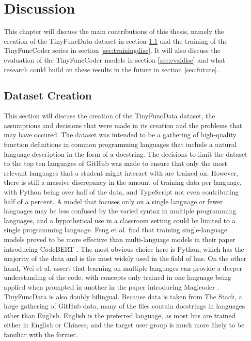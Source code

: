 \chapter{Discussion}
\label{chap:discussion}
This chapter will discuss the main contributions of this thesis, namely the creation of the TinyFuncData dataset in section \ref{sec:datadisc} and the training of the TinyFuncCoder series in section \ref{sec:trainingdisc}.
It will also discuss the evaluation of the TinyFuncCoder models in section \ref{sec:evaldisc} and what research could build on these results in the future in section \ref{sec:future}.

\section{Dataset Creation}
\label{sec:datadisc}
This section will discuss the creation of the TinyFuncData dataset, the assumptions and decisions that were made in its creation and the problems that may have occured.
The dataset was intended to be a gathering of high-quality function definitions in common programming languages that include a natural language description in the form of a docstring.
The decisions to limit the dataset to the top ten languages of GitHub was made to ensure that only the most relevant languages that a student might interact with are trained on.
However, there is still a massive discrepancy in the amount of training data per language, with Python being over half of the data, and TypeScript not even contributing half of a percent.
A model that focuses only on a single language or fewer languages may be less confused by the varied syntax in multiple programming languages, and a hypothetical use in a classroom setting could be limited to a single programming language.
Feng et al. find that training single-language models proved to be more effective than multi-language models in their paper introducing CodeBERT \cite{Feng.2020}.
The most obvious choice here is Python, which has the majority of the data and is the most widely used in the field of \acp{lm}.
On the other hand, Wei et al. assert that learning on multiple languages can provide a deeper understanding of the code, with concepts only trained in one language being applied when prompted in another in the paper introducing Magicoder \cite{Wei.2024}.
TinyFuncData is also doubly bilingual.
Because data is taken from The Stack, a large gathering of GitHub data, many of the files contain docstrings in languages other than English.
English is the preferred language, as most \acp{lm} are trained either in English or Chinese, and the target user group is much more likely to be familiar with the former.
